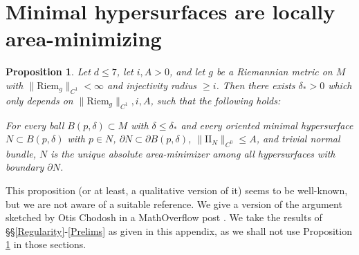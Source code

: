 \documentclass[reqno,11pt]{amsart}
\newcommand{\RR}{\mathbf{R}}
\newcommand*\dif{\mathop{}\!\mathrm{d}}
\newcommand{\Two}{\mathrm{I\!I}}
\newcommand{\Riem}{\mathrm{Riem}}
\newtheorem{lemma}[theorem]{Lemma}
\newtheorem{proposition}[theorem]{Proposition}
\theoremstyle{definition}
\numberwithin{equation}{section}
\begin{document}
\section{Minimal hypersurfaces are locally area-minimizing} \label{locally minimizing appendix}
\begin{proposition}\label{minimal implies locally minimizing}
Let $d \leq 7$, let $i, A > 0$, and let $g$ be a Riemannian metric on $M$ with $\|\Riem_g\|_{C^1} < \infty$ and injectivity radius $\geq i$.
Then there exists $\delta_* > 0$ which only depends on $\|\Riem_g\|_{C^1}, i, A$, such that the following holds:

For every ball $B(p, \delta) \subset M$ with $\delta \leq \delta_*$ and every oriented minimal hypersurface $N \subset B(p, \delta)$ with $p \in N$, $\partial N \subset \partial B(p, \delta)$, $\|\Two_N\|_{C^0} \leq A$, and trivial normal bundle, $N$ is the unique absolute area-minimizer among all hypersurfaces with boundary $\partial N$.
\end{proposition}

This proposition (or at least, a qualitative version of it) seems to be well-known, but we are not aware of a suitable reference.
We give a version of the argument sketched by Otis Chodosh in a MathOverflow post \cite{MathOverflowMinimalLocal}.
We take the results of \S\S\ref{Regularity}-\ref{Prelims} as given in this appendix, as we shall not use Proposition \ref{minimal implies locally minimizing} in those sections.

\end{document}
